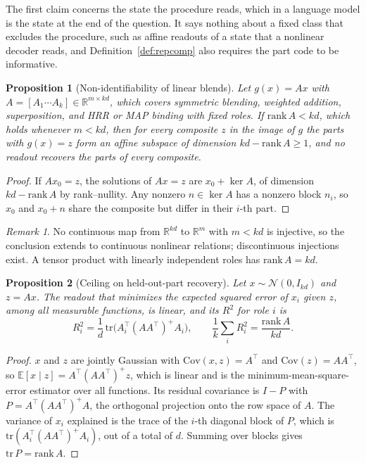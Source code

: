 \documentclass[10pt]{article}
\theoremstyle{plain}
\newtheorem{proposition}{Proposition}
\theoremstyle{remark}
\newtheorem*{remark}{Remark}
\newcommand{\R}{\mathbb{R}}
\begin{document}
\noindent
The first claim concerns the state the procedure reads, which in a language model is the state at the end of the question. It says nothing about a fixed class that excludes the procedure, such as affine readouts of a state that a nonlinear decoder reads, and Definition~\ref{def:repcomp} also requires the part code to be informative.

\begin{proposition}[Non-identifiability of linear blends]
\label{prop:fiber}
Let $g(x) = Ax$ with $A = [A_1 \cdots A_k] \in \R^{m \times kd}$, which covers symmetric blending, weighted addition, superposition, and HRR or MAP binding with fixed roles. If $\mathrm{rank}\,A < kd$, which holds whenever $m < kd$, then for every composite $z$ in the image of $g$ the parts with $g(x) = z$ form an affine subspace of dimension $kd - \mathrm{rank}\,A \geq 1$, and no readout recovers the parts of every composite.
\end{proposition}

\begin{proof}
If $Ax_0 = z$, the solutions of $Ax = z$ are $x_0 + \ker A$, of dimension $kd - \mathrm{rank}\,A$ by rank--nullity. Any nonzero $n \in \ker A$ has a nonzero block $n_i$, so $x_0$ and $x_0 + n$ share the composite but differ in their $i$-th part.
\end{proof}

\begin{remark}
No continuous map from $\R^{kd}$ to $\R^m$ with $m < kd$ is injective, so the conclusion extends to continuous nonlinear relations; discontinuous injections exist. A tensor product with linearly independent roles has $\mathrm{rank}\,A = kd$.
\end{remark}

\begin{proposition}[Ceiling on held-out-part recovery]
\label{prop:ceiling}
Let $x \sim \mathcal{N}(0, I_{kd})$ and $z = Ax$. The readout that minimizes the expected squared error of $x_i$ given $z$, among all measurable functions, is linear, and its $R^2$ for role $i$ is
\begin{equation}
  R^2_i = \frac{1}{d}\,\mathrm{tr}\big(A_i^{\top} (A A^{\top})^{+} A_i\big), \qquad \frac{1}{k}\sum_i R^2_i = \frac{\mathrm{rank}\,A}{kd}.
\end{equation}
\end{proposition}

\begin{proof}
$x$ and $z$ are jointly Gaussian with $\mathrm{Cov}(x, z) = A^{\top}$ and $\mathrm{Cov}(z) = AA^{\top}$, so $\mathbb{E}[x \mid z] = A^{\top}(AA^{\top})^{+}z$, which is linear and is the minimum-mean-square-error estimator over all functions. Its residual covariance is $I - P$ with $P = A^{\top}(AA^{\top})^{+}A$, the orthogonal projection onto the row space of $A$. The variance of $x_i$ explained is the trace of the $i$-th diagonal block of $P$, which is $\mathrm{tr}(A_i^{\top}(AA^{\top})^{+}A_i)$, out of a total of $d$. Summing over blocks gives $\mathrm{tr}\,P = \mathrm{rank}\,A$.
\end{proof}
\end{document}
